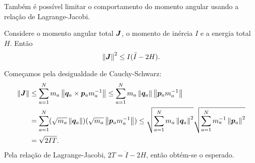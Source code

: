 Também é possível limitar o comportamento do momento angular usando a relação de Lagrange-Jacobi.

\begin{theorem}
    Considere o momento angular total $\bm J$, o momento de inércia $I$ e a energia total $H$. Então
    \begin{equation*}
        \left\Vert \bm J \right\Vert^2 \leq I (\ddot I - 2 H).
    \end{equation*}
\end{theorem}
\begin{Proof}
    Começamos pela desigualdade de Cauchy-Schwarz:
    \begin{align*}
        \left\Vert \bm J \right\Vert 
        &\leq \sum_{a=1}^{N} m_a \left\Vert \bm q_a \times \bm p_a m_a^{-1} \right\Vert
        \leq \sum_{a=1}^{N} m_a \left\Vert \bm q_a \right\Vert \left\Vert \bm p_a m_a^{-1} \right\Vert \\
        &= \sum_{a=1}^{N} (\sqrt{m_a} \left\Vert \bm q_a \right\Vert)(\sqrt{m_a}\left\Vert \bm p_a m_a^{-1} \right\Vert)
        \leq \sqrt{\sum_{a=1}^{N} m_a \left\Vert \bm q_a \right\Vert^2} \sqrt{\sum_{a=1}^{N} m_a^{-1} \left\Vert \bm p_a \right\Vert^2} \\
        &= \sqrt{2 I T}.
    \end{align*}
    Pela relação de Lagrange-Jacobi, $2T = \ddot I - 2 H$, então obtém-se o esperado.
\end{Proof}